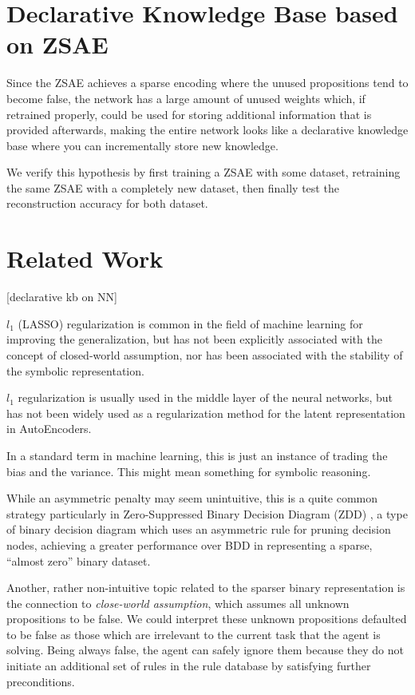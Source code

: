 \section{Declarative Knowledge Base based on ZSAE}

Since the ZSAE achieves a sparse encoding where the unused propositions
tend to become false, the network has a large amount of unused weights
which, if retrained properly, could be used for storing additional
information that is provided afterwards, making the entire network looks
like a declarative knowledge base where you can incrementally store
new knowledge.

We verify this hypothesis by first training a ZSAE with some dataset, retraining the same ZSAE with
a completely new dataset, then finally test the reconstruction accuracy for both dataset.

\section{Related Work}


[declarative kb on NN]




$l_1$ (LASSO) regularization is common in the field of machine learning for improving the
generalization,
but has not been explicitly associated with the concept of
closed-world assumption, nor has been associated with the stability of the symbolic representation.

$l_1$ regularization is usually used in the middle layer of the neural networks,
but has not been widely used as a regularization method for the latent representation in AutoEncoders.

In a standard term in machine learning, this is just an instance of trading the bias and the variance.
This might mean something for symbolic reasoning.

While an asymmetric penalty may seem unintuitive, this is a quite common
strategy particularly in Zero-Suppressed Binary Decision Diagram (ZDD)
\cite{minato1993zero}, a type of binary decision diagram \cite{bryant1986graph} which
uses an asymmetric rule for pruning decision nodes, achieving a greater
performance over BDD in representing a sparse, ``almost zero'' binary dataset.

Another, rather non-intuitive topic related to the sparser binary representation
is the connection to \emph{close-world assumption}, which assumes all unknown
propositions to be false.
% 
We could interpret these unknown propositions defaulted to be false as those which are irrelevant
to the current task that the agent is solving.
Being always false, the agent can safely ignore them because
they do not initiate an additional set of rules in the rule database by satisfying further preconditions.

